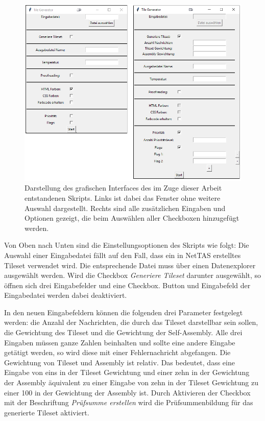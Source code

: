 \begin{figure}
    \centering
    \includegraphics[width=\textwidth]{images/Tile-Generator.png}
    \caption[GUI Screenshot]{Darstellung des grafischen Interfaces des im Zuge dieser Arbeit entstandenen Skripts. Links ist dabei das Fenster ohne weitere Auswahl dargestellt. Rechts sind alle zusätzlichen Eingaben und Optionen gezeigt, die beim Auswählen aller Checkboxen hinzugefügt werden.}
    \label{fig:gui}
\end{figure}

Von Oben nach Unten sind die Einstellungsoptionen des Skripts wie folgt: Die Auswahl einer Eingabedatei fällt auf den Fall, dass ein in NetTAS erstelltes Tileset verwendet wird. Die entsprechende Datei muss über einen Datenexplorer ausgewählt werden. Wird die Checkbox \emph{Generiere Tileset} darunter ausgewählt, so öffnen sich drei Eingabefelder und eine Checkbox. Button und Eingabefeld der Eingabedatei werden dabei deaktiviert. 

In den neuen Eingabefeldern können die folgenden drei Parameter festgelegt werden: die Anzahl der Nachrichten, die durch das Tileset darstellbar sein sollen, die Gewichtung des Tileset und die Gewichtung der Self-Assembly. Alle drei Eingaben müssen ganze Zahlen beinhalten und sollte eine andere Eingabe getätigt werden, so wird diese mit einer Fehlernachricht abgefangen. Die Gewichtung von Tileset und Assembly ist relativ. Das bedeutet, dass eine Eingabe von eins in der Tileset Gewichtung und einer zehn in der Gewichtung der Assembly äquivalent zu einer Eingabe von zehn in der Tileset Gewichtung zu einer 100 in der Gewichtung der Assembly ist. Durch Aktivieren der Checkbox mit der Beschriftung \emph{Prüfsumme erstellen} wird die Prüfsummenbildung für das generierte Tileset aktiviert.

